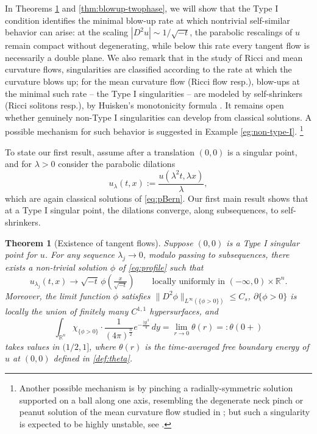 \documentclass[11pt]{article}
\numberwithin{equation}{section}
\newtheorem{theorem}{Theorem}[section]
\theoremstyle{definition}
\newcommand{\RR}{\mathbb{R}}
\begin{document}
In Theorems \ref{thm:blowup} and \ref{thm:blowup-twophase}, we will show that the Type I condition identifies the minimal blow-up rate at which nontrivial self-similar behavior can arise: at the scaling $|D^2u|\sim 1/\sqrt{-t}$, the parabolic rescalings of $u$ remain compact without degenerating, while below this rate every tangent flow is necessarily a double plane.
We also remark that in the study of Ricci and mean curvature flows, singularities are classified according to the rate at which the curvature blows up; for the mean curvature flow (Ricci flow resp.), blow-ups at the minimal such rate -- the Type I singularities -- are modeled by self-shrinkers (Ricci solitons resp.), by Huisken's monotonicity formula \cite{Huisken}.
It remains open whether genuinely non-Type I singularities can develop from classical solutions. A possible mechanism for such behavior is suggested in Example \ref{eg:non-type-I}. \footnote{Another possible mechanism is by pinching a radially-symmetric solution supported on a ball along one axis, resembling the degenerate neck pinch or peanut solution of the mean curvature flow studied in \cite{AAG, AV}; but such a singularity is expected to be highly unstable, see \cite{ADS}.} 

To state our first result, assume after a translation $(0,0)$ is a singular point, and for $\lambda>0$ consider the parabolic dilations
\[
	u_\lambda(t,x) := \frac{u(\lambda^2 t, \lambda x)}{\lambda},
\]
which are again classical solutions of \eqref{eq:pBern}. Our first main result shows that at a Type I singular point, the dilations converge, along subsequences, to self-shrinkers.

\begin{theorem}[Existence of tangent flows]\label{thm:blowup}
    Suppose $(0,0)$ is a Type I singular point for $u$.
    For any sequence $\lambda_j \to 0$, modulo passing to subsequences, there exists a non-trivial solution $\phi$ of \eqref{eq:profile} such that
    \[
        u_{\lambda_j}(t,x) \longrightarrow \sqrt{-t}\,\phi\!\left(\tfrac{x}{\sqrt{-t}}\right)
        \qquad \text{locally uniformly in } (-\infty,0)\times\RR^n.
    \]
    Moreover, the limit function $\phi$ satisfies $\|D^2\phi\|_{L^\infty(\{\phi>0\})} \leq C_s$, $\partial \{\phi>0\}$ is locally the union of finitely many $C^{1,1}$ hypersurfaces, and
    \begin{equation}\label{eq:density-tangent}
        \int_{\RR^n} \chi_{\{\phi>0\}} \cdot \frac{1}{(4\pi)^{\frac{n}{2}}} e^{-\frac{|y|^2}{4}} \, dy = \lim_{r\to 0} \theta(r) =: \theta(0+) 
    \end{equation}
    takes values in $(1/2, 1]$, where $\theta(r)$ is the time-averaged free boundary energy of $u$ at $(0,0)$ defined in \eqref{def:theta}.
\end{theorem}
\end{document}
